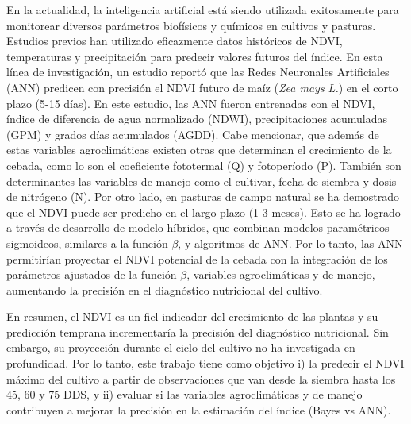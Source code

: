 \documentclass[
11pt, %
]{charter}
\begin{document}
En la actualidad, la inteligencia artificial está siendo utilizada exitosamente para monitorear diversos parámetros biofísicos y químicos en cultivos y pasturas. Estudios previos han utilizado eficazmente datos históricos de NDVI, temperaturas y precipitación para predecir valores futuros del índice. En esta línea de investigación, un estudio reportó que las Redes Neuronales Artificiales (ANN) predicen con precisión el NDVI futuro de maíz (\emph{Zea mays L.}) en el corto plazo (5-15 días). En este estudio, las ANN fueron entrenadas con el NDVI, índice de diferencia de agua normalizado (NDWI), precipitaciones acumuladas (GPM) y grados días acumulados (AGDD).  Cabe mencionar, que además de estas variables agroclimáticas existen otras que determinan el crecimiento de la cebada, como lo son el coeficiente fototermal (Q) y fotoperíodo (P). También son determinantes las variables de manejo como el cultivar, fecha de siembra y dosis de nitrógeno (N). Por otro lado, en pasturas de campo natural se ha demostrado que el NDVI puede ser predicho en el largo plazo (1-3 meses). Esto se ha logrado a través de desarrollo de modelo híbridos, que combinan modelos paramétricos sigmoideos, similares a la función $\beta$, y algoritmos de ANN. Por lo tanto, las ANN permitirían proyectar el NDVI potencial de la cebada con la integración de los parámetros ajustados de la función $\beta$, variables agroclimáticas y de manejo, aumentando la precisión en el diagnóstico nutricional del cultivo.

En resumen, el NDVI es un fiel indicador del crecimiento de las plantas y su predicción temprana incrementaría la precisión del diagnóstico nutricional. Sin embargo, su proyección durante el ciclo del cultivo no ha investigada en profundidad. Por lo tanto, este trabajo tiene como objetivo i) la predecir el NDVI máximo del cultivo a partir de observaciones que van desde la siembra hasta los 45, 60 y 75 DDS, y ii) evaluar si las variables agroclimáticas y de manejo contribuyen a mejorar la precisión en la estimación del índice (Bayes vs ANN).
\end{document}
